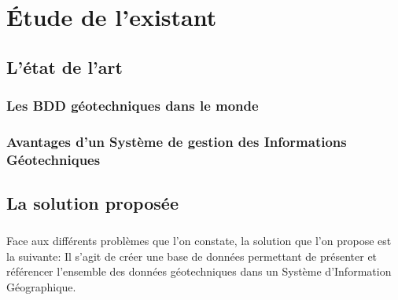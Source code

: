 \chapter{Étude de l'existant}
    \section{L'état de l'art}
        \subsection{Les BDD géotechniques dans le monde}
            
        \subsection{Avantages d'un Système de gestion des Informations Géotechniques}
            
    \section{La solution proposée}
        \paragraph{}
        Face aux différents problèmes que l'on constate, la solution que l'on propose est la suivante:
        Il s'agit de créer une base de données permettant de présenter et référencer l’ensemble des 
        données géotechniques dans un Système d’Information Géographique.
    
